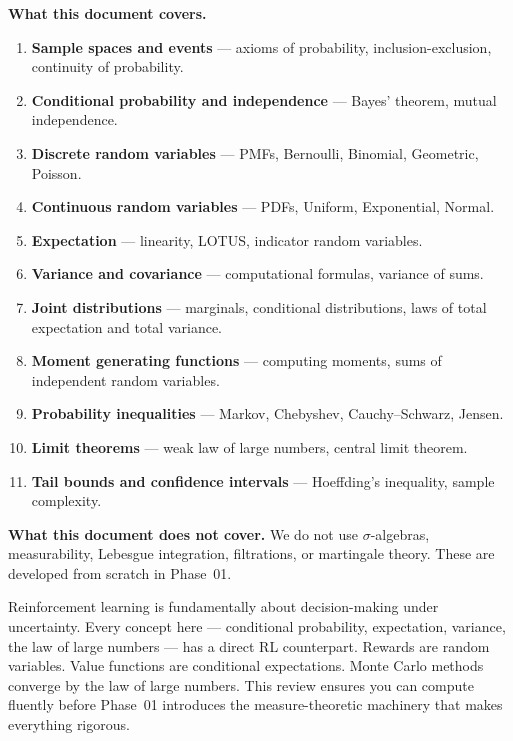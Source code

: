 \documentclass[11pt,a4paper]{article}
\theoremstyle{definition}
\theoremstyle{plain}
\theoremstyle{remark}
\begin{document}
\medskip\noindent\textbf{What this document covers.}
\begin{enumerate}[nosep]
    \item \textbf{Sample spaces and events} --- axioms of probability, inclusion-exclusion,
          continuity of probability.
    \item \textbf{Conditional probability and independence} --- Bayes' theorem, mutual
          independence.
    \item \textbf{Discrete random variables} --- PMFs, Bernoulli, Binomial, Geometric, Poisson.
    \item \textbf{Continuous random variables} --- PDFs, Uniform, Exponential, Normal.
    \item \textbf{Expectation} --- linearity, LOTUS, indicator random variables.
    \item \textbf{Variance and covariance} --- computational formulas, variance of sums.
    \item \textbf{Joint distributions} --- marginals, conditional distributions, laws of total
          expectation and total variance.
    \item \textbf{Moment generating functions} --- computing moments, sums of independent
          random variables.
    \item \textbf{Probability inequalities} --- Markov, Chebyshev, Cauchy--Schwarz, Jensen.
    \item \textbf{Limit theorems} --- weak law of large numbers, central limit theorem.
    \item \textbf{Tail bounds and confidence intervals} --- Hoeffding's inequality, sample
          complexity.
\end{enumerate}

\medskip\noindent\textbf{What this document does not cover.}
We do not use $\sigma$-algebras, measurability, Lebesgue integration, filtrations,
or martingale theory. These are developed from scratch in Phase~01.

\begin{rlconnection}
Reinforcement learning is fundamentally about decision-making under uncertainty. Every
concept here --- conditional probability, expectation, variance, the law of large
numbers --- has a direct RL counterpart. Rewards are random variables. Value functions are
conditional expectations. Monte Carlo methods converge by the law of large numbers. This
review ensures you can compute fluently before Phase~01 introduces the measure-theoretic
machinery that makes everything rigorous.
\end{rlconnection}
\end{document}
